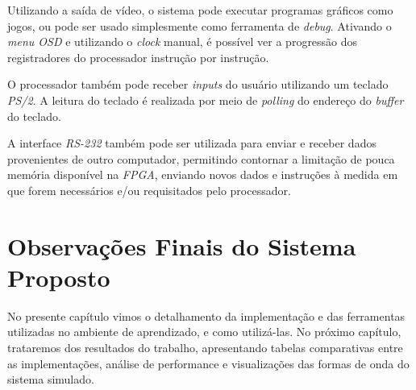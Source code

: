     { Utilizando a saída de vídeo, o sistema pode executar programas gráficos
        como jogos, ou pode ser usado simplesmente como ferramenta de \textit{debug}.
        Ativando o \textit{menu OSD} e utilizando o \textit{clock} manual, é
        possível ver a progressão dos registradores do processador instrução por
        instrução.
    }

    { O processador também pode receber \textit{inputs} do usuário utilizando
        um teclado \textit{PS/2}. A leitura do teclado é realizada por meio de
        \textit{polling} do endereço do \textit{buffer} do teclado.
    }

    { A interface \textit{RS-232} também pode ser utilizada para enviar e receber
        dados provenientes de outro computador, permitindo contornar a limitação
        de pouca memória disponível na \textit{FPGA}, enviando novos dados e
        instruções à medida em que forem necessários e/ou requisitados pelo
        processador.
    }


\section{Observações Finais do Sistema Proposto}
    { No presente capítulo vimos o detalhamento da implementação e das ferramentas
        utilizadas no ambiente de aprendizado, e como utilizá-las. No próximo
        capítulo, trataremos dos resultados do trabalho, apresentando tabelas
        comparativas entre as implementações, análise de performance e visualizações
        das formas de onda do sistema simulado.
    }


